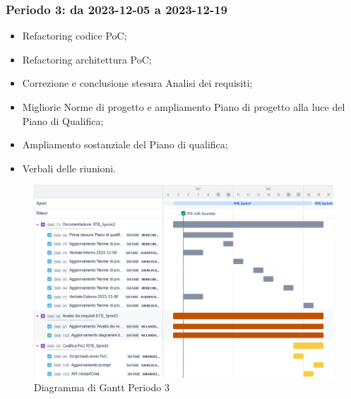 \documentclass[10pt, a4paper]{article}
\begin{document}
{{{{{{{{\subsubsection{Periodo 3: da 2023-12-05 a 2023-12-19}
\begin{itemize}
    \item Refactoring codice PoC;
    \item Refactoring architettura PoC;
    \item Correzione e conclusione stesura Analisi dei requisiti;
    \item Migliorie Norme di progetto e ampliamento Piano di progetto alla luce del Piano di Qualifica;
    \item Ampliamento sostanziale del Piano di qualifica;
    \item Verbali delle riunioni.
\end{itemize}
\begin{figure}[H]
    \centering        
    \includegraphics[width=15.5cm]{gantt/ganttPeriodo3.png}
    \caption{Diagramma di Gantt Periodo 3 }
\end{figure}
\newpage
}}}}}}}}
\end{document}
